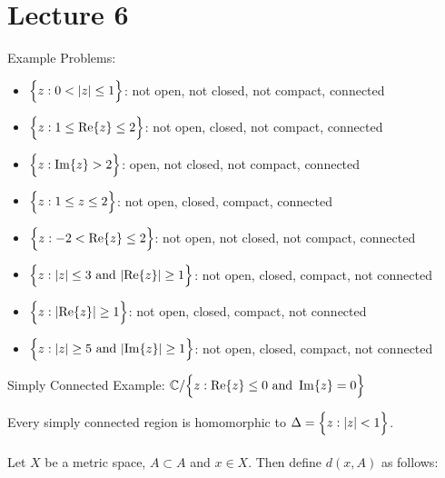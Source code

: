 \documentclass[12pt]{article}
\begin{document}
\section{Lecture 6} 
Example Problems: \begin{itemize} 
\item $\Big\{ z: 0 < \abs{z} \leq 1 \Big\}$: not open, not closed, not compact, connected 
\item $\Big\{ z: 1 \leq \Re{z} \leq 2 \Big\}$: not open, closed, not compact, connected 
\item $\Big\{ z: \Im{z} > 2 \Big\}$: open, not closed, not compact, connected 
\item $\Big\{ z: 1 \leq z \leq 2 \Big\}$: not open, closed, compact, connected 
\item $\Big\{ z: -2 < \Re{z} \leq 2 \Big\}$: not open, not closed, not compact, connected 
\item $\Big\{ z: \abs{z} \leq 3 \text{ and } \abs{\Re{z}} \geq 1 \Big\}$: not open, closed, compact, not connected 
\item $\Big\{ z: \abs{\Re{z}} \geq 1 \Big\}$: not open, closed, compact, not connected 
\item $\Big\{ z: \abs{z} \geq 5 \text{ and } \abs{\Im{z}} \geq 1 \Big\}$: not open, closed, compact, not connected \end{itemize} 
\begin{definition} Simply Connected Example: $\mathbb{C} / \Big\{ z: \Re{z} \leq 0 \text{ and } \Im{z} = 0 \Big\}$ \end{definition} 
Every simply connected region is homomorphic to $\Delta = \Big\{ z: \abs{z} < 1 \Big\}$. \\~\\
Let $X$ be a metric space, $A \subset A$ and $x \in X$. Then define $d(x,A)$ as follows: 
\end{document}
